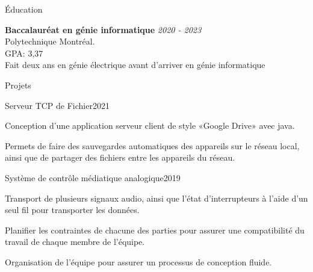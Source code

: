 \documentclass[french,12pt]{resume} %
\begin{document}
	
	
	\begin{rSection}{Éducation}
		
		{\bf Baccalauréat en génie informatique} \hfill {\em  2020 - 2023} 
		\\ Polytechnique Montréal.
		\\GPA: 3,37 
		\\ Fait deux ans en génie électrique avant d'arriver en génie informatique
		
		
		
	\end{rSection}
	
	
	\begin{rSection}{Projets}
		\begin{rSubsection}{Serveur TCP de Fichier}{2021}{}{}
			\item Conception d'une application serveur client de style «Google Drive» avec java.
			\item Permets de faire des sauvegardes automatiques des appareils sur le réseau local, ainsi que de partager des fichiers entre les appareils du réseau.
		\end{rSubsection}
		
		\begin{rSubsection}{Système de contrôle médiatique analogique}{2019}{}{}
			\item   Transport de plusieurs signaux audio, ainsi que l'état d'interrupteurs à l'aide d'un seul fil pour transporter les données.
			\item Planifier les contraintes de chacune des parties pour assurer une compatibilité du travail de chaque membre de l'équipe.
			\item Organisation de l'équipe pour assurer un processus de conception fluide.
		\end{rSubsection}

		

		
	\end{rSection}
	
\end{document}
